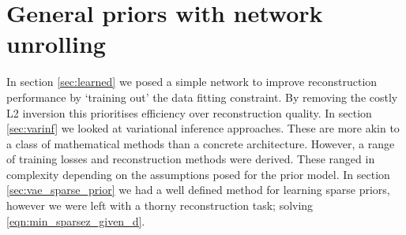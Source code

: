 \documentclass[12pt]{article}
\begin{document}
\section{General priors with network unrolling}\label{sec:unrolling}
In section \ref{sec:learned} we posed a simple network to improve reconstruction performance by `training out' the data fitting constraint. By removing the costly L2 inversion this prioritises efficiency over reconstruction quality. In section \ref{sec:varinf} we looked at variational inference approaches. These are more akin to a class of mathematical methods than a concrete architecture. However, a range of training losses and reconstruction methods were derived. These ranged in complexity depending on the assumptions posed for the prior model. In section \ref{sec:vae_sparse_prior} we had a well defined method for learning sparse priors, however we were left with a thorny reconstruction task; solving \ref{eqn:min_sparsez_given_d}. 
\end{document}
